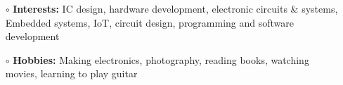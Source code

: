 \documentclass[margin , 10pt]{res} %
\begin{document}
\begin{resume}
		\begin{itemize}
			\item[$\circ$] \textbf{Interests:} IC design, hardware development, electronic circuits \& systems, Embedded systems, IoT, circuit design, programming and software development
			\item[$\circ$] \textbf{Hobbies:} Making electronics, photography, 
			reading books, watching movies, learning to play guitar
		\end{itemize}
		
		
		
		
		
		
		
		
		
		

\end{resume}
\end{document}
